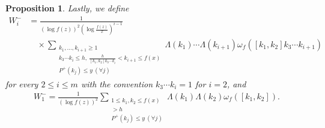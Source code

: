 \documentclass[a4paper,11pt]{amsart}
\newtheorem{proposition}[theorem]{Proposition}
\theoremstyle{definition}
\numberwithin{equation}{section}
\begin{document}
\begin{proposition}
Lastly, we define 
\begin{align*}
W_i^-
&= \frac{1}{(\log{f(z)})^2 \left(\log{\frac{f(z)}{x}}\right)^{i-1}} \\
&\quad \times
\sum_{\substack{k_1,\ldots,k_{i+1} \geq 1 \\ [k_1,k_2] k_3 \cdots k_{i} \leq h,~ \frac{h}{[k_1,k_2] k_3 \cdots k_{i}}<k_{i+1} \leq f(x) \\ P^+(k_j) \leq y ~(\forall j)}} 
\Lambda(k_1) \cdots \Lambda(k_{i+1}) \omega_f([k_1,k_2] k_3 \cdots k_{i+1}) 
\end{align*}
for every $2 \leq i \leq m$ with the convention $k_3 \cdots k_{i}=1$ for $i=2$, and 
\begin{align*}
W_1^-
= \frac{1}{(\log{f(z)})^2} \sum_{\substack{1 \leq k_1, k_2 \leq f(x) \\ [k_1,k_2]>h \\ P^+(k_j) \leq y ~(\forall j) }} 
\Lambda(k_1) \Lambda(k_2) \omega_f([k_1,k_2]). 
\end{align*}
\end{proposition}
\end{document}
